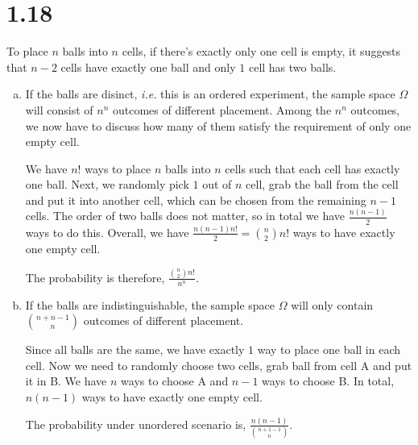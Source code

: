 \documentclass[letterpaper]{article}
\begin{document}
    \section*{1.18}
    To place $n$ balls into $n$ cells, if there's exactly only one cell is empty, it suggests that $n-2$ cells have
    exactly one ball and only $1$ cell has two balls. 
    
    \begin{enumerate}[(a)]
    \item If the balls are disinct, \emph{i.e.} this is an ordered experiment, the sample space $\Omega$ 
    will consist of $n^n$ outcomes of different placement. Among the $n^n$ outcomes, we now have to 
    discuss how many of them satisfy the requirement of only one empty cell.

    We have $n!$ ways to place $n$ balls into $n$ cells such that each cell has exactly one ball.
    Next, we randomly pick $1$ out of $n$ cell, grab the ball from the cell and put it into another cell,
    which can be chosen from the remaining $n-1$ cells. The order of two balls does not matter, so 
    in total we have $\frac{n (n-1)}{2}$ ways to do this.
    Overall, we have $\frac{n(n-1) n!}{2} = \binom{n}{2} n!$ ways to have exactly one empty cell.

    The probability is therefore, $\frac{\binom{n}{2} n!}{n^n}$.

    \item If the balls are indistinguishable, the sample space $\Omega$ will only contain 
    $\binom{n+n-1}{n}$ outcomes of different placement. 
    
    Since all balls are the same, we have exactly $1$ way to place one ball in each cell. 
    Now we need to randomly choose two cells, grab ball from cell A and put it in B. We have $n$ ways
    to choose A and $n-1$ ways to choose B. In total, $n(n-1)$ ways to have exactly one empty cell.

    The probability under unordered scenario is, $\frac{n(n-1)}{\binom{n+1-1}{n}}$.

    \end{enumerate}
\end{document}

